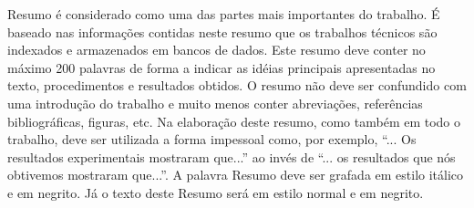 \documentclass{ceel}
\begin{document}
\begin{multicols}{2}
\begin{enumerate}
Resumo é considerado como uma das partes mais importantes do trabalho. É baseado nas informações contidas neste resumo que os trabalhos técnicos são indexados e armazenados em bancos de dados. Este resumo deve conter no máximo 200 palavras de forma a indicar as idéias principais apresentadas no texto, procedimentos e resultados obtidos. O resumo não deve ser confundido com uma introdução do trabalho e muito menos conter abreviações, referências bibliográficas, figuras, etc. Na elaboração deste resumo, como também em todo o trabalho, deve ser utilizada a forma impessoal como, por exemplo, “... Os resultados experimentais mostraram que...” ao invés de “... os resultados que nós obtivemos mostraram que...”. A palavra Resumo deve ser grafada em estilo itálico e em negrito. Já o texto deste Resumo será em estilo normal e em negrito.\\


\end{enumerate}
\end{multicols}
\end{document}
